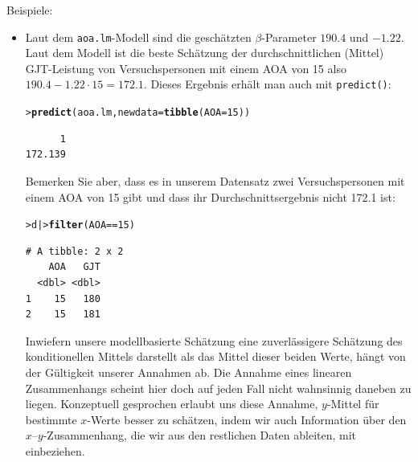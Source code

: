 \documentclass[oneside, 10pt]{book}\usepackage[]{graphicx}\usepackage[]{xcolor}
\makeatletter
\newcommand{\hlnum}[1]{\textcolor[rgb]{0.686,0.059,0.569}{#1}}%
\newcommand{\hlopt}[1]{\textcolor[rgb]{0,0,0}{#1}}%
\newcommand{\hlstd}[1]{\textcolor[rgb]{0.345,0.345,0.345}{#1}}%
\newcommand{\hlkwc}[1]{\textcolor[rgb]{0.333,0.667,0.333}{#1}}%
\newcommand{\hlkwd}[1]{\textcolor[rgb]{0.737,0.353,0.396}{\textbf{#1}}}%
\newenvironment{kframe}{%
 \def\at@end@of@kframe{}%
 \ifinner\ifhmode%
  \def\at@end@of@kframe{\end{minipage}}%
  \begin{minipage}{\columnwidth}%
 \fi\fi%
 \def\FrameCommand##1{\hskip\@totalleftmargin \hskip-\fboxsep
 \colorbox{shadecolor}{##1}\hskip-\fboxsep
     \hskip-\linewidth \hskip-\@totalleftmargin \hskip\columnwidth}%
 \MakeFramed {\advance\hsize-\width
   \@totalleftmargin\z@ \linewidth\hsize
   \@setminipage}}%
 {\par\unskip\endMakeFramed%
 \at@end@of@kframe}
\newenvironment{knitrout}{}{} %
\makeatother
\begin{document}
Beispiele:
\begin{itemize}
 \item Laut dem \texttt{aoa.lm}-Modell sind die geschätzten
 $\beta$-Parameter $190.4$ und $-1.22$. Laut dem Modell ist
 die beste Schätzung der durchschnittlichen (Mittel) GJT-Leistung
 von Versuchspersonen mit einem AOA von 15 also $190.4 - 1.22 \cdot 15 = 172.1$.
 Dieses Ergebnis erhält man auch mit \texttt{predict()}:
\begin{knitrout}
\color{fgcolor}\begin{kframe}
\begin{alltt}
\hlstd{> }\hlkwd{predict}\hlstd{(aoa.lm,} \hlkwc{newdata} \hlstd{=} \hlkwd{tibble}\hlstd{(}\hlkwc{AOA} \hlstd{=} \hlnum{15}\hlstd{))}
\end{alltt}
\begin{verbatim}
      1 
172.139 
\end{verbatim}
\end{kframe}
\end{knitrout}
  Bemerken Sie aber, dass es in unserem Datensatz zwei Versuchspersonen
  mit einem AOA von 15 gibt und dass ihr Durchschnittsergebnis nicht 172.1 ist:
\begin{knitrout}
\color{fgcolor}\begin{kframe}
\begin{alltt}
\hlstd{> }\hlstd{d |>} \hlkwd{filter}\hlstd{(AOA} \hlopt{==} \hlnum{15}\hlstd{)}
\end{alltt}
\begin{verbatim}
# A tibble: 2 x 2
    AOA   GJT
  <dbl> <dbl>
1    15   180
2    15   181
\end{verbatim}
\end{kframe}
\end{knitrout}
Inwiefern unsere modellbasierte Schätzung eine zuverlässigere Schätzung des
konditionellen Mittels darstellt als das Mittel dieser beiden Werte, hängt
von der Gültigkeit unserer Annahmen ab. Die Annahme eines linearen Zusammenhangs
scheint hier doch auf jeden Fall nicht wahnsinnig daneben zu liegen.
Konzeptuell gesprochen erlaubt uns diese Annahme,
$y$-Mittel für bestimmte $x$-Werte besser zu schätzen,
indem wir auch Information über den $x$--$y$-Zusammenhang,
die wir aus den restlichen Daten ableiten, mit einbeziehen.


\end{itemize}
\end{document}
